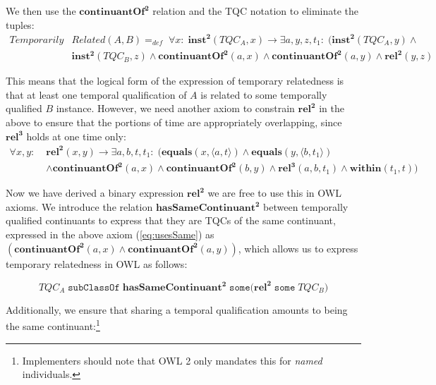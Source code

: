 \documentclass{ao2e}
\newcommand{\mirel}[1]{\ensuremath{\mathrm{\mathbf{#1}}}}
\newcommand{\mclass}[1]{\ensuremath{\mathit{#1}}}
\newcommand{\mrel}[2]{\mirel{#1^#2}}
\newcommand{\mrelb}[1]{\mrel{#1}{2}}
\newcommand{\mrelt}[1]{\mrel{#1}{3}}
\newcommand{\pair}[2]{\ensuremath{\langle #1,#2\rangle}}
\newcommand{\TQC}[1]{\ensuremath{TQC_{\mclass{#1}}}}
\begin{document}
We then use the \mrelb{continuantOf} relation and the TQC notation to eliminate
the tuples:
\begin{equation}
\begin{split}
\mclass{Temporarily}&\mclass{Related}(\mclass{A},\mclass{B}) =_{def}\;
\forall x:\; \mrelb{inst}(\TQC{A}, x)
 \rightarrow
\exists a,y,z,t_1:\;(\mrelb{inst}(\TQC{A},y) \wedge \\ & \mrelb{inst}(\TQC{B},z) 
 \wedge \mrelb{continuantOf}(a,x) \wedge \mrelb{continuantOf}(a,y) \wedge
\mrelb{rel}(y,z) 
\end{split}
\label{eq:usesSame}
\end{equation}

This means that the logical form of the expression of temporary relatedness is that
at least one temporal qualification of \mclass{A} is related to some temporally
qualified \mclass{B} instance.
However, we need another axiom to constrain \mrelb{rel} in the above to ensure that the
portions of time are appropriately overlapping, since \mrelt{rel} holds at one time
only:
\begin{equation}
\begin{split}
\forall x,y:\;& \mrelb{rel}(x,y) \rightarrow \exists a,b,t,t_1:\;
(\mirel{equals}(x,\pair{a}{t})\wedge \mirel{equals}(y,\pair{b}{t_1})\\ 
& \wedge \mrelb{continuantOf}(a,x) \wedge \mrelb{continuantOf}(b,y) \wedge
\mrelt{rel}(a,b,t_1) \wedge \mirel{within}(t_1,t))
\end{split}
\end{equation}

Now we have derived a binary expression \mrelb{rel} we are free to use this in OWL
axioms. We introduce the relation \mrelb{hasSameContinuant} between temporally qualified
continuants to express that they are TQCs of the same continuant,
expressed in the above axiom (\ref{eq:usesSame}) as $(\mrelb{continuantOf}(a,x)
\wedge \mrelb{continuantOf}(a,y))$, which allows us to express temporary relatedness in OWL as follows:

\begin{equation}
\TQC{A}\;\mathtt{subClassOf}\;\mrelb{hasSameContinuant}\;\mathtt{some
(}\mrelb{rel}\;\mathtt{some}\;\TQC{B}) 
\label{eq:tqc:temp}
\end{equation}

Additionally, we ensure that sharing a temporal qualification amounts to being
the same continuant:\footnote{Implementers should note that OWL 2 only mandates
this for \emph{named} individuals.}
\end{document}
